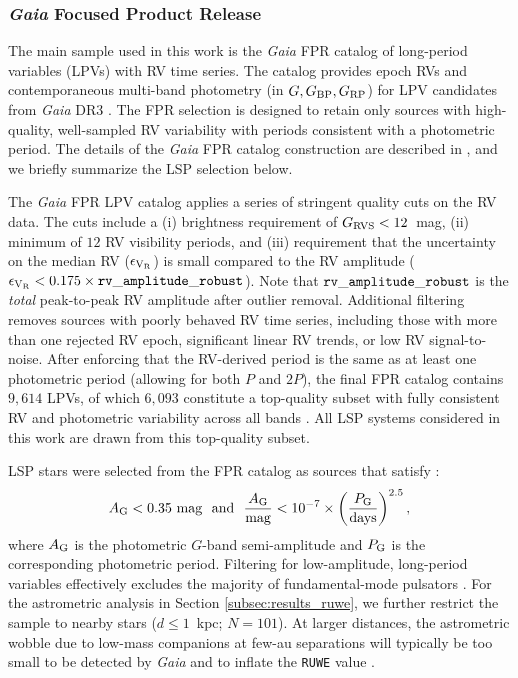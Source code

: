 \documentclass[trackchanges,twocolumn]{aastex631}
\begin{document}
\subsubsection{{\it Gaia} Focused Product Release}\label{subsubsec:methodology_sample_FPR}

The main sample used in this work is the {\it Gaia} FPR catalog of long-period variables (LPVs) with RV time series. The catalog provides epoch RVs and contemporaneous multi-band photometry (in $G,G_{\rm BP},G_{\rm RP}$) for LPV candidates from {\it Gaia} DR3 \citep{Lebzelter23,Gaia_FPR}. The FPR selection is designed to retain only sources with high-quality, well-sampled RV variability with periods consistent with a photometric period. The details of the {\it Gaia} FPR catalog construction are described in \citet{Gaia_FPR}, and we briefly summarize the LSP selection below.


The {\it Gaia} FPR LPV catalog applies a series of stringent quality cuts on the RV data. The cuts include a (i) brightness requirement of $G_{\rm RVS}<12$~mag, (ii) minimum of $12$ RV visibility periods, and (iii) requirement that the uncertainty on the median RV ($\epsilon_{\rm V_R}$) is small compared to the RV amplitude ($\epsilon_{\rm V_R}<0.175\times{\tt rv\_amplitude\_robust}$). Note that ${\tt rv\_amplitude\_robust}$ is the {\it total} peak-to-peak RV amplitude after outlier removal. Additional filtering removes sources with poorly behaved RV time series, including those with more than one rejected RV epoch, significant linear RV trends, or low RV signal-to-noise. After enforcing that the RV-derived period is the same as at least one photometric period (allowing for both $P$ and $2P$), the final FPR catalog contains $9{,}614$ LPVs, of which $6{,}093$ constitute a top-quality subset with fully consistent RV and photometric variability across all bands \citep{Gaia_FPR}. All LSP systems considered in this work are drawn from this top-quality subset. 

LSP stars were selected from the FPR catalog as sources that satisfy \citep[][]{Lebzelter23,Gaia_FPR}:
\begin{equation}\label{eq:gaia_cut}
    A_{\rm G}<0.35~{\rm mag}~~{\rm and}~~ \frac{A_{\rm G}}{{\rm mag}} < 10^{-7} \times \left( \frac{P_{\rm G}}{{\rm days}}\right)^{2.5},
\end{equation}
where $A_{\rm G}$ is the photometric $G$-band semi-amplitude and $P_{\rm G}$ is the corresponding photometric period. Filtering for low-amplitude, long-period variables effectively excludes the majority of fundamental-mode pulsators \citep[][]{Gaia_FPR}.
For the astrometric analysis in Section \ref{subsec:results_ruwe}, we further restrict the sample to nearby stars ($d \leq 1$~kpc; $N=101$). At larger distances, the astrometric wobble due to low-mass companions at few-au separations will typically be too small to be detected by {\it Gaia} and to inflate the {\tt RUWE} value \citep[][]{Belokurov20, Sullivan25, ElBadry25}.
\end{document}
